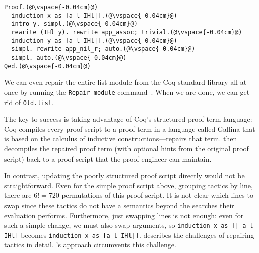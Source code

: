 \begin{lstlisting}
Proof.(@\vspace{-0.04cm}@)
  induction x as [a l IHl|].(@\vspace{-0.04cm}@)
  intro y. simpl.(@\vspace{-0.04cm}@)
  rewrite (IHl y). rewrite app_assoc; trivial.(@\vspace{-0.04cm}@)
  induction y as [a l IHl|].(@\vspace{-0.04cm}@)
  simpl. rewrite app_nil_r; auto.(@\vspace{-0.04cm}@)
  simpl. auto.(@\vspace{-0.04cm}@)
Qed.(@\vspace{-0.04cm}@)
\end{lstlisting}
We can even repair the entire list module from the Coq standard library all at once by running the \lstinline{Repair module}
command~. %
When we are done, we can get rid of \lstinline{Old.list}. %

The key to success is taking advantage of Coq's structured proof term language:
Coq compiles every proof script to a proof term in a language called Gallina that is based on the calculus of inductive 
constructions---\toolname repairs that term.
\toolname then decompiles the repaired proof term (with optional hints from the original proof script) back 
to a proof script that the proof engineer can maintain.

In contrast, updating the poorly structured proof script directly would not be straightforward.
Even for the simple proof script above, grouping tactics by line, there are $6! = 720$ permutations of this proof script.
It is not clear which lines to swap since these tactics do not have a semantics beyond the searches their evaluation performs.
Furthermore, just swapping lines is not enough: even for such a simple change, we must also swap
arguments, so \lstinline{induction x as [| a l IHl]} becomes \lstinline{induction x as [a l IHl|]}.
\citet{robert2018} describes the challenges of repairing tactics in detail.
\toolname's approach circumvents this challenge.




